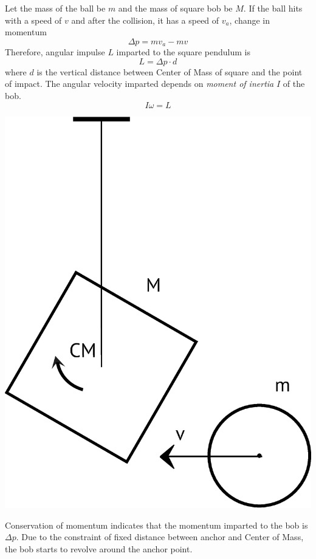 \documentclass[11pt]{article}%
\begin{document}
Let the mass of the ball be $m$ and the mass of square bob be $M$. If the ball hits with a speed of $v$ and after the collision, it has a speed of $v_a$, change in momentum \begin{equation}\Delta p = mv_a-mv\end{equation}
Therefore, angular impulse $L$ imparted to the square pendulum is \begin{equation}L=\Delta p\cdot d\end{equation} where $d$ is the vertical distance between Center of Mass of square and the point of impact. 
The angular velocity imparted depends on \emph{moment of inertia} $I$ of the bob.\begin{equation}I\omega=L\end{equation}
\centerline{\includegraphics[scale=0.2]{sqpendulumnotexec}}
Conservation of momentum indicates that the momentum imparted to the bob is $\Delta p$. Due to the constraint of fixed distance between anchor and Center of Mass, the bob starts to revolve around the anchor point.
\end{document}
